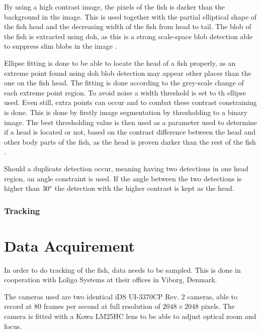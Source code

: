 By using a high contrast image, the pixels of the fish is darker than the background in the image. This is used together with the partial elliptical shape of the fish head and the decreasing width of the fish from head to tail. The blob of the fish is extracted using \gls{doh}, as this is a strong scale-space blob detection able to suppress slim blobs in the image \citep{Qian2014}.

Ellipse fitting is done to be able to locate the head of a fish properly, as an extreme point found using \gls{doh} blob detection may appear other places than the one on the fish head. The fitting is done according to the grey-scale change of each extreme point region. To avoid noise a width threshold is set to th ellipse used. Even still, extra points can occur and to combat these contrast constraining is done. This is done by firstly image segmentation by thresholding to a binary image. The best thresholding value is then used as a parameter used to determine if a head is located or not, based on the contrast difference between the head and other body parts of the fish, as the head is proven darker than the rest of the fish \citep{Qian2014}.

Should a duplicate detection occur, meaning having two detections in one head region, an angle constraint is used. If the angle between the two detections is higher than $30 \degree$ the detection with the higher contrast is kept as the head.

\subsubsection{Tracking}



\section{Data Acquirement}
In order to do tracking of the fish, data needs to be sampled. This is done in cooperation with Loligo Systems at their offices in Viborg, Denmark.

The cameras used are two identical iDS UI-3370CP Rev. 2 cameras, able to record at $80$ frames per second at full resolution of $ 2048\times2048 $ pixels. The camera is fitted with a Kowa LM25HC lens to be able to adjust optical zoom and focus. 
